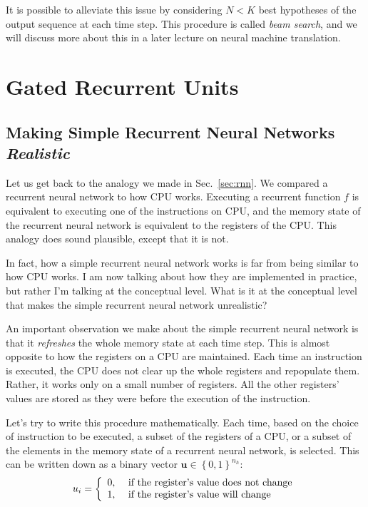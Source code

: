 \documentclass{report}
\newcommand{\vect}[1]{\mathbf{#1}}
\newcommand{\vu}[0]{\vect{u}}
\begin{document}
It is possible to alleviate this issue by considering $N<K$ best hypotheses of
the output sequence at each time step. This procedure is called {\em beam
search}, and we will discuss more about this in a later lecture on neural
machine translation.

\section{Gated Recurrent Units}

\subsection{Making Simple Recurrent Neural Networks {\em Realistic}}

Let us get back to the analogy we made in Sec.~\ref{sec:rnn}. We compared a
recurrent neural network to how CPU works. Executing a recurrent function $f$ is
equivalent to executing one of the instructions on CPU, and the memory state of
the recurrent neural network is equivalent to the registers of the CPU. This
analogy does sound plausible, except that it is not.

In fact, how a simple recurrent neural network works is far from being similar
to how CPU works. I am now talking about how they are implemented in practice,
but rather I'm talking at the conceptual level. What is it at the conceptual
level that makes the simple recurrent neural network unrealistic?

An important observation we make about the simple recurrent neural network is
that it {\em refreshes} the whole memory state at each time step. This is almost
opposite to how the registers on a CPU are maintained. Each time an instruction
is executed, the CPU does not clear up the whole registers and repopulate them.
Rather, it works only on a small number of registers. All the other registers'
values are stored as they were before the execution of the instruction.

Let's try to write this procedure mathematically. Each time, based on the choice
of instruction to be executed, a subset of the registers of a CPU, or a subset
of the elements in the memory state of a recurrent neural network, is selected.
This can be written down as a binary vector $\vu \in \left\{ 0, 1\right\}^{n_h}$:
\begin{align*}
    u_i = \left\{ 
        \begin{array}{l l}
            0, & \text{ if the register's value does not change} \\
            1, & \text{ if the register's value will change}
        \end{array}
        \right.
\end{align*}
\end{document}

